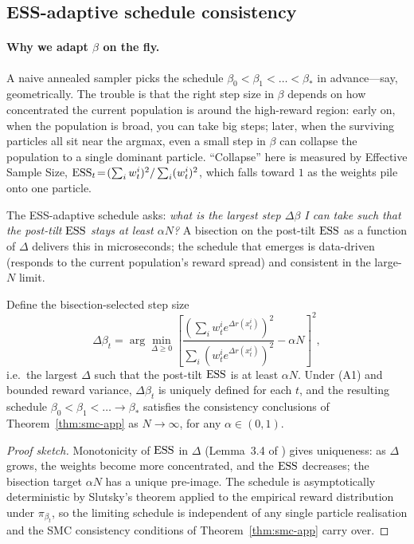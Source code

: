 \subsection{ESS-adaptive schedule consistency}\label{app:ess}

\paragraph{Why we adapt $\beta$ on the fly.}
A naive annealed sampler picks the schedule $\beta_0\!<\!\beta_1\!<\!\dots\!<\!\beta_*$ in advance—say, geometrically. The trouble is that the right step size in $\beta$ depends on how concentrated the current population is around the high-reward region: early on, when the population is broad, you can take big steps; later, when the surviving particles all sit near the argmax, even a small step in $\beta$ can collapse the population to a single dominant particle. ``Collapse'' here is measured by Effective Sample Size, $\operatorname{ESS}_t\!=\!(\sum_i w_t^i)^2/\sum_i (w_t^i)^2$, which falls toward $1$ as the weights pile onto one particle.

The ESS-adaptive schedule asks: \emph{what is the largest step $\Delta\beta$ I can take such that the post-tilt $\operatorname{ESS}$ stays at least $\alpha N$?} A bisection on the post-tilt $\operatorname{ESS}$ as a function of $\Delta$ delivers this in microseconds; the schedule that emerges is data-driven (responds to the current population's reward spread) and consistent in the large-$N$ limit.

\begin{lemma}\label{lem:ess-app}
Define the bisection-selected step size
\[
\Delta\beta_t = \arg\min_{\Delta\geq 0}\!\left[\frac{(\sum_i w_t^i e^{\Delta r(x_t^i)})^2}{\sum_i (w_t^i e^{\Delta r(x_t^i)})^2}-\alpha N\right]^2,
\]
i.e.\ the largest $\Delta$ such that the post-tilt $\operatorname{ESS}$ is at least $\alpha N$. Under (A1) and bounded reward variance, $\Delta\beta_t$ is uniquely defined for each $t$, and the resulting schedule $\beta_0\!<\!\beta_1\!<\!\dots\!\to\!\beta_*$ satisfies the consistency conclusions of Theorem~\ref{thm:smc-app} as $N\!\to\!\infty$, for any $\alpha\!\in\!(0,1)$.
\end{lemma}

\begin{proof}[Proof sketch]
Monotonicity of $\operatorname{ESS}$ in $\Delta$ (Lemma~3.4 of \citealt{delmoral2012adaptive}) gives uniqueness: as $\Delta$ grows, the weights become more concentrated, and the $\operatorname{ESS}$ decreases; the bisection target $\alpha N$ has a unique pre-image. The schedule is asymptotically deterministic by Slutsky's theorem applied to the empirical reward distribution under $\pi_{\beta_t}$, so the limiting schedule is independent of any single particle realisation and the SMC consistency conditions of Theorem~\ref{thm:smc-app} carry over.
\end{proof}

